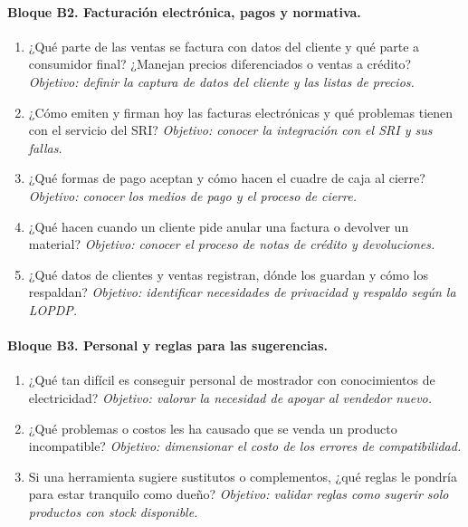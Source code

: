 \paragraph{Bloque B2. Facturación electrónica, pagos y normativa.}
\begin{enumerate}[label=B2.\arabic*, leftmargin=*]
\item ¿Qué parte de las ventas se factura con datos del cliente y qué parte a consumidor final? ¿Manejan precios diferenciados o ventas a crédito? \emph{Objetivo: definir la captura de datos del cliente y las listas de precios.}
\item ¿Cómo emiten y firman hoy las facturas electrónicas y qué problemas tienen con el servicio del SRI? \emph{Objetivo: conocer la integración con el SRI y sus fallas.}
\item ¿Qué formas de pago aceptan y cómo hacen el cuadre de caja al cierre? \emph{Objetivo: conocer los medios de pago y el proceso de cierre.}
\item ¿Qué hacen cuando un cliente pide anular una factura o devolver un material? \emph{Objetivo: conocer el proceso de notas de crédito y devoluciones.}
\item ¿Qué datos de clientes y ventas registran, dónde los guardan y cómo los respaldan? \emph{Objetivo: identificar necesidades de privacidad y respaldo según la LOPDP.}
\end{enumerate}

\paragraph{Bloque B3. Personal y reglas para las sugerencias.}
\begin{enumerate}[label=B3.\arabic*, leftmargin=*]
\item ¿Qué tan difícil es conseguir personal de mostrador con conocimientos de electricidad? \emph{Objetivo: valorar la necesidad de apoyar al vendedor nuevo.}
\item ¿Qué problemas o costos les ha causado que se venda un producto incompatible? \emph{Objetivo: dimensionar el costo de los errores de compatibilidad.}
\item Si una herramienta sugiere sustitutos o complementos, ¿qué reglas le pondría para estar tranquilo como dueño? \emph{Objetivo: validar reglas como sugerir solo productos con stock disponible.}
\end{enumerate}

